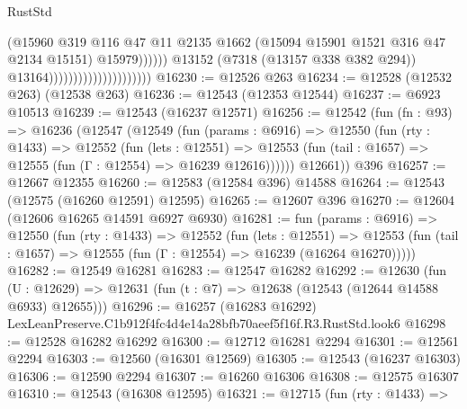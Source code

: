 \begin{lexlean}{RustStd}
\begin{coremodule}
                                                        (@15960
                                                          @319
                                                          @116
                                                          @47
                                                          @11
                                                          @2135
                                                          @1662
                                                          (@15094
                                                            @15901
                                                            @1521
                                                            @316
                                                            @47
                                                            @2134
                                                            @15151)
                                                          @15979))))))
                                              @13152
                                              (@7318 (@13157 @338 @382 @294))
                                              @13164)))))))))))))))))))))
@16230 := @12526 @263
@16234 := @12528 (@12532 @263) (@12538 @263)
@16236 := @12543 (@12353 @12544)
@16237 := @6923 @10513
@16239 := @12543 (@16237 @12571)
@16256 := @12542
    (fun (fn : @93) =>
    @16236
      (@12547
        (@12549
          (fun (params : @6916) =>
          @12550
            (fun (rty : @1433) =>
            @12552
              (fun (lets : @12551) =>
              @12553 (fun (tail : @1657) => @12555 (fun (Γ : @12554) => @16239 @12616))))))
        @12661))
    @396
@16257 := @12667 @12355
@16260 := @12583 (@12584 @396) @14588
@16264 := @12543 (@12575 (@16260 @12591) @12595)
@16265 := @12607 @396
@16270 := @12604 (@12606 @16265 @14591 @6927 @6930)
@16281 := fun (params : @6916) =>
  @12550
    (fun (rty : @1433) =>
    @12552
      (fun (lets : @12551) =>
      @12553 (fun (tail : @1657) => @12555 (fun (Γ : @12554) => @16239 (@16264 @16270)))))
@16282 := @12549 @16281
@16283 := @12547 @16282
@16292 := @12630
    (fun (U : @12629) => @12631 (fun (t : @7) => @12638 (@12543 (@12644 @14588 @6933) @12655)))
@16296 := @16257 (@16283 @16292) LexLeanPreserve.C1b912f4fc4d4e14a28bfb70aeef5f16f.R3.RustStd.look6
@16298 := @12528 @16282 @16292
@16300 := @12712 @16281 @2294
@16301 := @12561 @2294
@16303 := @12560 (@16301 @12569)
@16305 := @12543 (@16237 @16303)
@16306 := @12590 @2294
@16307 := @16260 @16306
@16308 := @12575 @16307
@16310 := @12543 (@16308 @12595)
@16321 := @12715
    (fun (rty : @1433) =>

\end{coremodule}
\end{lexlean}
